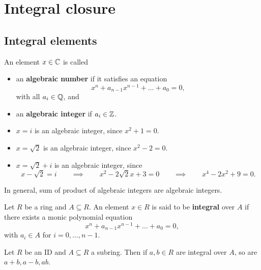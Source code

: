 \pagebreak

\section{Integral closure}

\subsection{Integral elements}

\begin{definition}
An element $ x \in \mathbb{C} $ is called
\begin{itemize}
\item an \textbf{algebraic number} if it satisfies an equation
$$ x^n + a_{n - 1}x^{n - 1} + \dots + a_0 = 0, $$
with all $ a_i \in \mathbb{Q} $, and
\item an \textbf{algebraic integer} if $ a_i \in \mathbb{Z} $.
\end{itemize}
\end{definition}

\begin{example*}
\hfill
\begin{itemize}
\item $ x = i $ is an algebraic integer, since $ x^2 + 1 = 0 $.
\item $ x = \sqrt{2} $ is an algebraic integer, since $ x^2 - 2 = 0 $.
\item $ x = \sqrt{2} + i $ is an algebraic integer, since
$$ x - \sqrt{2} = i \qquad \implies \qquad x^2 - 2\sqrt{2}x + 3 = 0 \qquad \implies \qquad x^4 - 2x^2 + 9 = 0. $$
\end{itemize}
\end{example*}

In general, sum of product of algebraic integers are algebraic integers.

\begin{definition}
Let $ R $ be a ring and $ A \subseteq R $. An element $ x \in R $ is said to be \textbf{integral} over $ A $ if there exists a monic polynomial equation
$$ x^n + a_{n - 1}x^{n - 1} + \dots + a_0 = 0, $$
with $ a_i \in A $ for $ i = 0, \dots, n - 1 $.
\end{definition}

\begin{theorem}
\label{thm:integralsubring}
Let $ R $ be an ID and $ A \subseteq R $ a subring. Then if $ a, b \in R $ are integral over $ A $, so are $ a + b, a - b, ab $.
\end{theorem}

